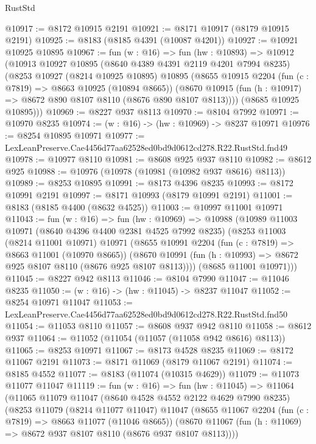 \begin{lexlean}{RustStd}
\begin{coremodule}
@10917 := @8172 @10915 @2191
@10921 := @8171 @10917 (@8179 @10915 @2191)
@10925 := @8183 (@8185 @4391 (@10087 @4201))
@10927 := @10921 @10925 @10895
@10967 := fun (w : @16) =>
  fun (hw : @10893) =>
  @10912
    (@10913
      @10927
      @10895
      (@8640 @4389 @4391 @2119 @4201 @7994 @8235)
      (@8253
        @10927
        (@8214 @10925 @10895)
        @10895
        (@8655
          @10915
          @2204
          (fun (c : @7819) => @8663 @10925 (@10894 @8665))
          (@8670 @10915 (fun (h : @10917) => @8672 @890 @8107 @8110 (@8676 @890 @8107 @8113))))
        (@8685 @10925 @10895)))
@10969 := @8227 @937 @8113
@10970 := @8104 @7992
@10971 := @10970 @8235
@10974 := (w : @16) -> (hw : @10969) -> @8237 @10971
@10976 := @8254 @10895 @10971
@10977 := LexLeanPreserve.Cae4456d77aa62528ed0bd9d0612cd278.R22.RustStd.fnd49
@10978 := @10977 @8110
@10981 := @8608 @925 @937 @8110
@10982 := @8612 @925
@10988 := @10976 (@10978 (@10981 (@10982 @937 @8616) @8113))
@10989 := @8253 @10895
@10991 := @8173 @4396 @8235
@10993 := @8172 @10991 @2191
@10997 := @8171 @10993 (@8179 @10991 @2191)
@11001 := @8183 (@8185 @4400 (@8632 @4525))
@11003 := @10997 @11001 @10971
@11043 := fun (w : @16) =>
  fun (hw : @10969) =>
  @10988
    (@10989
      @11003
      @10971
      (@8640 @4396 @4400 @2381 @4525 @7992 @8235)
      (@8253
        @11003
        (@8214 @11001 @10971)
        @10971
        (@8655
          @10991
          @2204
          (fun (c : @7819) => @8663 @11001 (@10970 @8665))
          (@8670 @10991 (fun (h : @10993) => @8672 @925 @8107 @8110 (@8676 @925 @8107 @8113))))
        (@8685 @11001 @10971)))
@11045 := @8227 @942 @8113
@11046 := @8104 @7990
@11047 := @11046 @8235
@11050 := (w : @16) -> (hw : @11045) -> @8237 @11047
@11052 := @8254 @10971 @11047
@11053 := LexLeanPreserve.Cae4456d77aa62528ed0bd9d0612cd278.R22.RustStd.fnd50
@11054 := @11053 @8110
@11057 := @8608 @937 @942 @8110
@11058 := @8612 @937
@11064 := @11052 (@11054 (@11057 (@11058 @942 @8616) @8113))
@11065 := @8253 @10971
@11067 := @8173 @4528 @8235
@11069 := @8172 @11067 @2191
@11073 := @8171 @11069 (@8179 @11067 @2191)
@11074 := @8185 @4552
@11077 := @8183 (@11074 (@10315 @4629))
@11079 := @11073 @11077 @11047
@11119 := fun (w : @16) =>
  fun (hw : @11045) =>
  @11064
    (@11065
      @11079
      @11047
      (@8640 @4528 @4552 @2122 @4629 @7990 @8235)
      (@8253
        @11079
        (@8214 @11077 @11047)
        @11047
        (@8655
          @11067
          @2204
          (fun (c : @7819) => @8663 @11077 (@11046 @8665))
          (@8670 @11067 (fun (h : @11069) => @8672 @937 @8107 @8110 (@8676 @937 @8107 @8113))))

\end{coremodule}
\end{lexlean}
